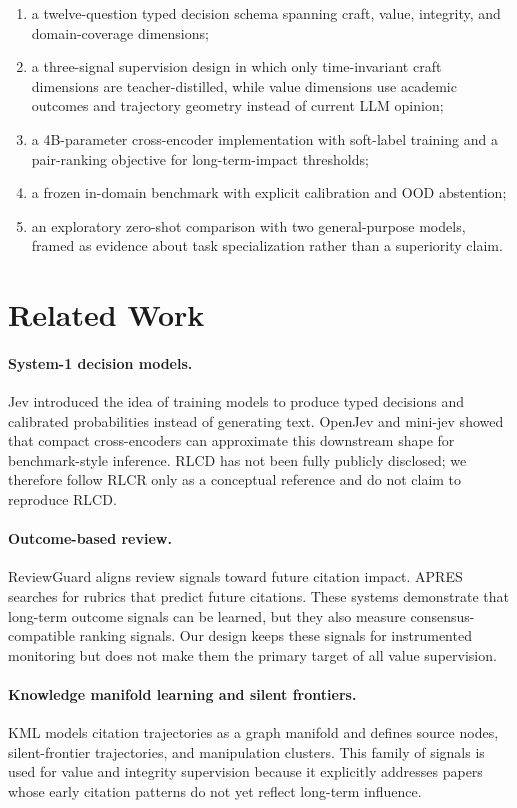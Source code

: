 \documentclass[11pt]{article}
\begin{document}
\begin{enumerate}
  \item a twelve-question typed decision schema spanning craft, value,
        integrity, and domain-coverage dimensions;
  \item a three-signal supervision design in which only time-invariant craft
        dimensions are teacher-distilled, while value dimensions use academic
        outcomes and trajectory geometry instead of current LLM opinion;
  \item a 4B-parameter cross-encoder implementation with soft-label training
        and a pair-ranking objective for long-term-impact thresholds;
  \item a frozen in-domain benchmark with explicit calibration and OOD
        abstention;
  \item an exploratory zero-shot comparison with two general-purpose models,
        framed as evidence about task specialization rather than a superiority
        claim.
\end{enumerate}

\section{Related Work}

\paragraph{System-1 decision models.}
Jev introduced the idea of training models to produce typed decisions and
calibrated probabilities instead of generating text. OpenJev and mini-jev
showed that compact cross-encoders can approximate this downstream shape for
benchmark-style inference. RLCD has not been fully publicly disclosed; we
therefore follow RLCR only as a conceptual reference and do not claim to
reproduce RLCD.

\paragraph{Outcome-based review.}
ReviewGuard aligns review signals toward future citation impact. APRES searches
for rubrics that predict future citations. These systems demonstrate that
long-term outcome signals can be learned, but they also measure
consensus-compatible ranking signals. Our design keeps these signals for
instrumented monitoring but does not make them the primary target of all value
supervision.

\paragraph{Knowledge manifold learning and silent frontiers.}
KML models citation trajectories as a graph manifold and defines source nodes,
silent-frontier trajectories, and manipulation clusters. This family of signals
is used for value and integrity supervision because it explicitly addresses
papers whose early citation patterns do not yet reflect long-term influence.
\end{document}
